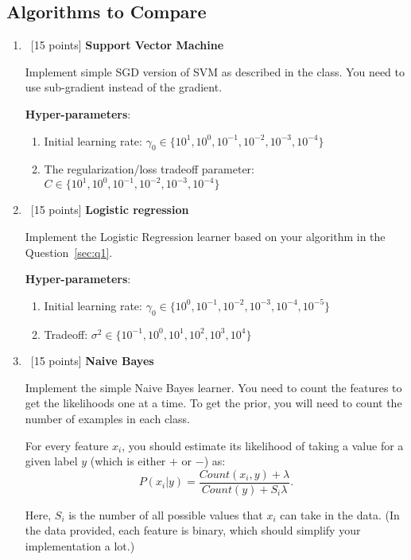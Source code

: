 \subsection{Algorithms to Compare}

\begin{enumerate}
\item~[15 points] \textbf{Support Vector Machine}

  Implement simple SGD version of SVM as described in the class. You
  need to use sub-gradient instead of the gradient.

  \textbf{Hyper-parameters}: 
  \begin{enumerate}
  \item Initial learning rate: $\gamma_0\in\{10^1, 10^0, 10^{-1}, 10^{-2}, 10^{-3}, 10^{-4}\}$
  \item The regularization/loss tradeoff parameter: $C\in \{10^1, 10^0, 10^{-1}, 10^{-2}, 10^{-3}, 10^{-4}\}$
  \end{enumerate}
  
\item~[15 points] \textbf{Logistic regression}

  Implement the Logistic Regression learner based on your algorithm in
  the Question~\ref{sec:q1}.

  \textbf{Hyper-parameters}: 
  \begin{enumerate}
  \item Initial learning rate: $\gamma_0\in\{10^0, 10^{-1}, 10^{-2}, 10^{-3}, 10^{-4}, 10^{-5}\}$
  \item Tradeoff: $\sigma^2\in \{10^{-1}, 10^0, 10^{1}, 10^{2}, 10^{3}, 10^{4}\}$
  \end{enumerate}

\item~[15 points] \textbf{Naive Bayes}

  Implement the simple Naive Bayes learner. You need to count the
  features to get the likelihoods one at a time. To get the prior, you
  will need to count the number of examples in each class.  

  For every feature $x_i$, you should estimate its likelihood of
  taking a value for a given label $y$ (which is either $+$ or $-$)
  as:
  \begin{equation*}
    P(x_i \vert y) = \frac{Count(x_i, y)+\lambda}{Count(y)+S_i\lambda}.
  \end{equation*}

  Here, $S_i$ is the number of all possible values that $x_i$ can take
  in the data. (In the data provided, each feature is binary, which
  should simplify your implementation a lot.)


\end{enumerate}
